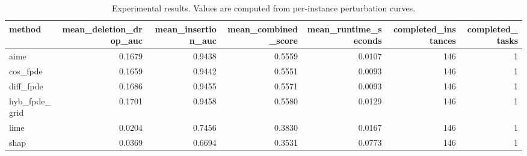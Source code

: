 \begin{table}[t]
\caption{Experimental results. Values are computed from per-instance perturbation curves.}
\label{tab:main_results_computed}
\centering
\begin{tabular}{lrrrrrr}
\toprule
method & mean\_deletion\_drop\_auc & mean\_insertion\_auc & mean\_combined\_score & mean\_runtime\_seconds & completed\_instances & completed\_tasks \\
\midrule
aime & 0.1679 & 0.9438 & 0.5559 & 0.0107 & 146 & 1 \\
cos\_fpde & 0.1659 & 0.9442 & 0.5551 & 0.0093 & 146 & 1 \\
diff\_fpde & 0.1686 & 0.9455 & 0.5571 & 0.0093 & 146 & 1 \\
hyb\_fpde\_grid & 0.1701 & 0.9458 & 0.5580 & 0.0129 & 146 & 1 \\
lime & 0.0204 & 0.7456 & 0.3830 & 0.0167 & 146 & 1 \\
shap & 0.0369 & 0.6694 & 0.3531 & 0.0773 & 146 & 1 \\
\bottomrule
\end{tabular}

\end{table}
